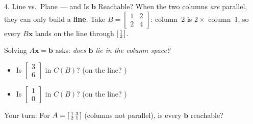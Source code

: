 \documentclass[10pt]{article}
\newcommand{\xx}{\mathbf{x}}
\newcommand{\bb}{\mathbf{b}}
\begin{document}
\begin{notesbox}{4. Line vs.\ Plane --- and Is $\bb$ Reachable?}
When the two columns \emph{are} parallel, they can only build a \textbf{line}. Take
$B=\begin{bmatrix} 1 & 2 \\ 2 & 4 \end{bmatrix}$: column~2 is
$2\times$ column~1, so every $B\xx$ lands on the line through $\begin{bsmallmatrix} 1\\2 \end{bsmallmatrix}$.
\begin{center}
\end{center}
Solving $A\xx=\bb$ asks: \emph{does $\bb$ lie in the column space?}
\begin{itemize}\setlength{\itemsep}{1pt}
  \item Is $\begin{bmatrix} 3 \\ 6 \end{bmatrix}$ in $C(B)$? \blank{2.6cm} (on the line? \blank{1.2cm})
  \item Is $\begin{bmatrix} 1 \\ 0 \end{bmatrix}$ in $C(B)$? \blank{2.6cm} (on the line? \blank{1.2cm})
\end{itemize}
Your turn: For $A=\begin{bsmallmatrix} 1&3\\2&1 \end{bsmallmatrix}$ (columns not parallel), is
every $\bb$ reachable? \writeline
\end{notesbox}
\end{document}
